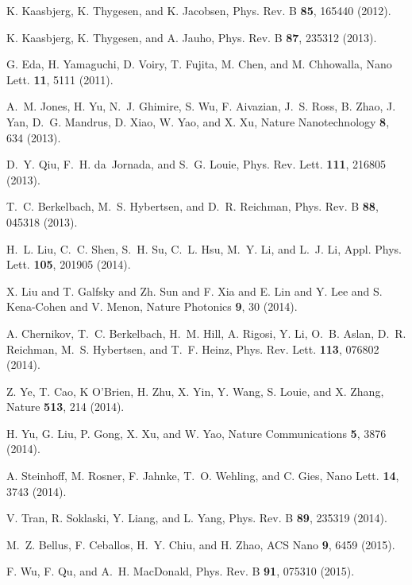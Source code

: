 \documentclass[aps,prb,superscriptaddress,letterpaper,amsmath,amssymb,twocolumn,preprintnumbers]{revtex4}
\begin{document}
\begin{thebibliography}{10}
K. Kaasbjerg, K. Thygesen, and K. Jacobsen, Phys. Rev. B {\bf 85},  165440
  (2012).

K. Kaasbjerg, K. Thygesen, and A. Jauho, Phys. Rev. B {\bf 87},  235312
  (2013).

G. Eda, H. Yamaguchi, D. Voiry, T. Fujita, M. Chen, and M. Chhowalla, Nano
  Lett. {\bf 11},  5111  (2011).

A.~M. Jones, H. Yu, N.~J. Ghimire, S. Wu, F. Aivazian, J.~S. Ross, B. Zhao, J.
  Yan, D.~G. Mandrus, D. Xiao, W. Yao, and X. Xu, Nature Nanotechnology {\bf
  8},  634  (2013).

D.~Y. Qiu, F.~H. da~Jornada, and S.~G. Louie, Phys. Rev. Lett. {\bf 111},
  216805   (2013).

T.~C. Berkelbach, M.~S. Hybertsen, and D.~R. Reichman, Phys. Rev. B {\bf 88},
  045318   (2013).

H.~L. Liu, C.~C. Shen, S.~H. Su, C.~L. Hsu, M.~Y. Li, and L.~J. Li, Appl. Phys.
  Lett. {\bf 105},  201905   (2014).

{X. Liu and T. Galfsky and Zh. Sun and F. Xia and E. Lin and Y. Lee and S.
  Kena-Cohen and V. Menon}, Nature Photonics {\bf 9},  30   (2014).

A. Chernikov, T.~C. Berkelbach, H.~M. Hill, A. Rigosi, Y. Li, O.~B. Aslan,
  D.~R. Reichman, M.~S. Hybertsen, and T.~F. Heinz, Phys. Rev. Lett. {\bf 113},
   076802   (2014).

Z. Ye, T. Cao, K O'Brien, H. Zhu, X. Yin, Y. Wang, S. Louie, and X. Zhang,
  Nature {\bf 513},  214   (2014).

H. Yu, G. Liu, P. Gong, X. Xu, and W. Yao, Nature Communications {\bf 5},  3876
   (2014).

A. Steinhoff, M. Rosner, F. Jahnke, T.~O. Wehling, and C. Gies, Nano Lett. {\bf
  14},  3743  (2014).

V. Tran, R. Soklaski, Y. Liang, and L. Yang, Phys. Rev. B {\bf 89},  235319
  (2014).

M.~Z. Bellus, F. Ceballos, H.~Y. Chiu, and H. Zhao, ACS Nano {\bf 9},  6459
  (2015).

F. Wu, F. Qu, and A.~H. MacDonald, Phys. Rev. B {\bf 91},  075310   (2015).


\end{thebibliography}
\end{document}
